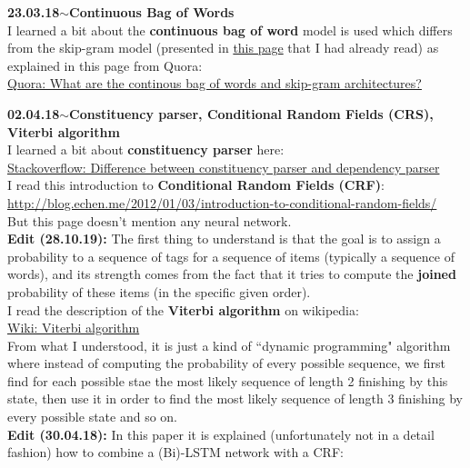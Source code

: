 \documentclass[11pt,a4paper]{article}
\newenvironment{loggentry}[2]%
{\noindent\textbf{#1}\hspace{1cm}$\mathbf{\sim}$\text{ }\textbf{#2}\\}{\vspace{0.5cm}}
\begin{document}
\begin{loggentry}{23.03.18}{Continuous Bag of Words}
I learned a bit about the \textbf{continuous bag of word} model is used which differs from the skip-gram model (presented in \href{http://mccormickml.com/2016/04/19/word2vec-tutorial-the-skip-gram-model/}{this page} that I had already read) as explained in this page from Quora:\\
\href{https://www.quora.com/What-are-the-continuous-bag-of-words-and-skip-gram-architectures}{Quora: What are the continous bag of words and skip-gram architectures?}\\
\end{loggentry}

\begin{loggentry}{02.04.18}{Constituency parser, Conditional Random Fields (CRS), Viterbi algorithm}
I learned a bit about \textbf{constituency parser} here:\\
\href{https://stackoverflow.com/questions/10401076/difference-between-constituency-parser-and-dependency-parser}{Stackoverflow: Difference between constituency parser and dependency parser}\\
I read this introduction to \textbf{Conditional Random Fields (CRF)}:\\
\url{http://blog.echen.me/2012/01/03/introduction-to-conditional-random-fields/}\\
But this page doesn't mention any neural network.\\
\textbf{Edit (28.10.19):} The first thing to understand is that the goal is to assign a probability to a sequence of tags for a sequence of items (typically a sequence of words), and its strength comes from the fact that it tries to compute the \textbf{joined} probability of these items (in the specific given order).\\
I read the description of the \textbf{Viterbi algorithm} on wikipedia:\\
\href{https://en.wikipedia.org/wiki/Viterbi_algorithm}{Wiki: Viterbi algorithm}\\
From what I understood, it is just a kind of ``dynamic programming" algorithm where instead of computing the probability of every possible sequence, we first find for each possible stae the most likely sequence of length 2 finishing by this state, then use it in order to find the most likely sequence of length 3 finishing by every possible state and so on.\\
\textbf{Edit (30.04.18):} In this paper it is explained (unfortunately not in a detail fashion) how to combine a (Bi)-LSTM network with a CRF:\\

\end{loggentry}
\end{document}
